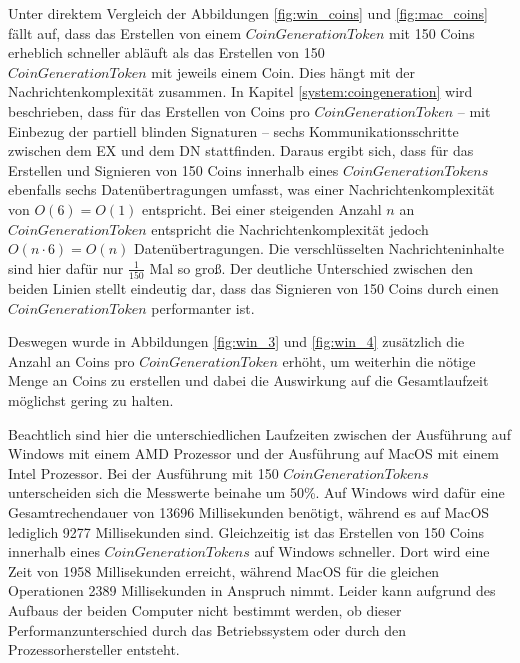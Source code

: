\documentclass[
	fontsize=11pt,
	headings=small,
	parskip=half,           %
	bibliography=totoc,
	numbers=noenddot,       %
	open=any,               %
]{scrreprt}
\begin{document}
Unter direktem Vergleich der Abbildungen \ref{fig:win_coins} und \ref{fig:mac_coins} fällt auf, dass das Erstellen von einem $CoinGenerationToken$ mit 150 Coins erheblich schneller abläuft als das Erstellen von 150 \\$CoinGenerationToken$ mit jeweils einem Coin. Dies hängt mit der Nachrichtenkomplexität zusammen. In Kapitel \ref{system:coingeneration} wird beschrieben, dass für das Erstellen von Coins pro $CoinGenerationToken$ -- mit Einbezug der partiell blinden Signaturen -- sechs Kommunikationsschritte zwischen dem EX und dem DN stattfinden. Daraus ergibt sich, dass für das Erstellen und Signieren von 150 Coins innerhalb eines $CoinGenerationTokens$ ebenfalls sechs Datenübertragungen umfasst, was einer Nachrichtenkomplexität von $O(6)=O(1)$ entspricht. Bei einer steigenden Anzahl $n$ an $CoinGenerationToken$ entspricht die Nachrichtenkomplexität jedoch $O(n\cdot6)=O(n)$ Datenübertragungen. Die verschlüsselten Nachrichteninhalte sind hier dafür nur $\frac{1}{150}$ Mal so groß. Der deutliche Unterschied zwischen den beiden Linien stellt eindeutig dar, dass das Signieren von 150 Coins durch einen $CoinGenerationToken$ performanter ist.

Deswegen wurde in Abbildungen \ref{fig:win_3} und \ref{fig:win_4} zusätzlich die Anzahl an Coins pro $CoinGenerationToken$ erhöht, um weiterhin die nötige Menge an Coins zu erstellen und dabei die Auswirkung auf die Gesamtlaufzeit möglichst gering zu halten.

Beachtlich sind hier die unterschiedlichen Laufzeiten zwischen der Ausführung auf Windows mit einem AMD Prozessor und der Ausführung auf MacOS mit einem Intel Prozessor. Bei der Ausführung mit 150 $CoinGenerationTokens$ unterscheiden sich die Messwerte beinahe um 50\%. Auf Windows wird dafür eine Gesamtrechendauer von 13696 Millisekunden benötigt, während es auf MacOS lediglich 9277 Millisekunden sind. Gleichzeitig ist das Erstellen von 150 Coins innerhalb eines $CoinGenerationTokens$ auf Windows schneller. Dort wird eine Zeit von 1958 Millisekunden erreicht, während MacOS für die gleichen Operationen 2389 Millisekunden in Anspruch nimmt. Leider kann aufgrund des Aufbaus der beiden Computer nicht bestimmt werden, ob dieser Performanzunterschied durch das Betriebssystem oder durch den Prozessorhersteller entsteht.\\
\end{document}
